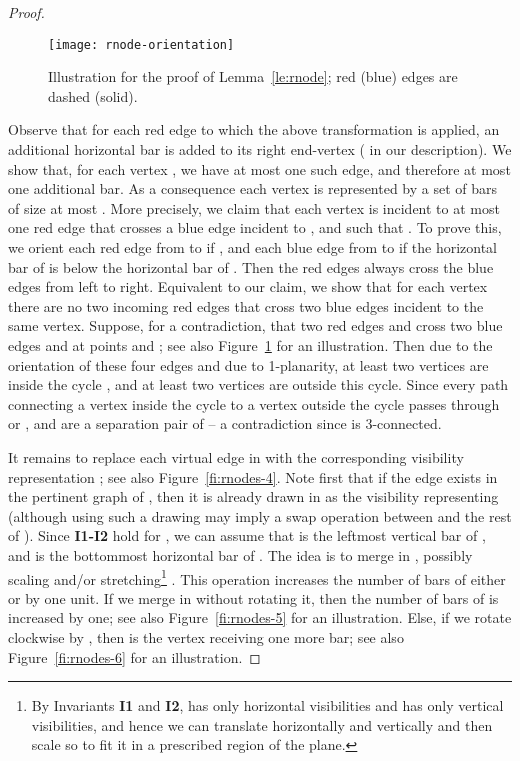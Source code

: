 \documentclass{article}
\begin{document}
\begin{proof}
\begin{figure}[t]
    \centering
    \texttt{[image: rnode-orientation]}
    \caption{Illustration for the proof of Lemma~\ref{le:rnode}; red (blue) edges are dashed (solid).\label{fi:rnode-orientation}}
\end{figure}


Observe that for each red edge  to which the above transformation is applied, an additional horizontal bar is added to its right end-vertex ( in our description). We show that, for each vertex , we have at most one such edge, and therefore at most one additional bar.  As a consequence each vertex  is represented by a set of bars of size at most . More precisely, we claim that each vertex  is incident to at most one red edge  that crosses a blue edge incident to , and such that . To prove this, we orient each red edge  from  to  if , and each blue edge  from  to  if the horizontal bar of  is below the horizontal bar of . Then the red edges always cross the blue edges from left to right. Equivalent to our claim, we show that for each vertex  there are no two incoming red edges that cross two blue edges incident to the same vertex. Suppose, for a contradiction, that two red edges  and  cross two blue edges  and  at points  and ; see also Figure~\ref{fi:rnode-orientation} for an illustration.  Then due to the orientation of these four edges and due to 1-planarity, at least two vertices are inside the cycle , and at least two vertices are outside this cycle. Since every path connecting a vertex inside the cycle to a vertex outside the cycle passes through  or ,  and  are a separation pair of  --  a contradiction since  is 3-connected.

It remains to replace each virtual edge  in  with the corresponding visibility representation ; see also Figure~\ref{fi:rnodes-4}. Note first that if the edge  exists in the pertinent graph  of , then it is already drawn in  as the visibility representing  (although using such a drawing may imply a swap operation between  and the rest of ). Since {\bf I1-I2} hold for , we can assume that  is the leftmost vertical bar of , and  is the bottommost horizontal bar of . The idea is to merge  in , possibly scaling and/or stretching\footnote{By Invariants {\bf I1} and {\bf I2},  has only horizontal visibilities and  has only vertical visibilities, and hence we can translate  horizontally and  vertically and then scale  so to fit it in a prescribed region of the plane.} . This operation increases  the number of bars of either  or  by one unit. If we merge  in  without rotating it, then the number of bars of  is increased by one; see also Figure~\ref{fi:rnodes-5} for an illustration. Else, if we rotate  clockwise by , then  is the vertex receiving one more bar; see also Figure~\ref{fi:rnodes-6} for an illustration.



\end{proof}
\end{document}
